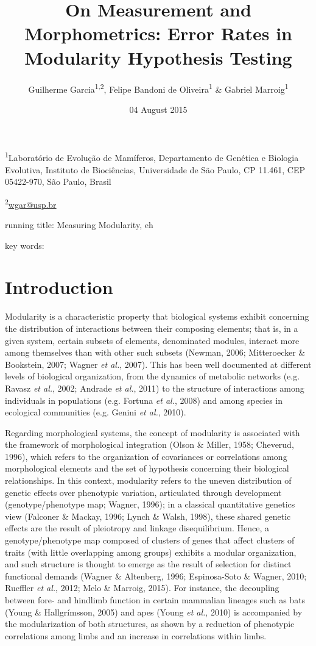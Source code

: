 \documentclass[12pt,]{article}
\title{On Measurement and Morphometrics: Error Rates in Modularity Hypothesis
Testing}
\author{Guilherme Garcia\textsuperscript{1,2}, Felipe Bandoni de
Oliveira\textsuperscript{1} \& Gabriel Marroig\textsuperscript{1}}
\date{04 August 2015}
\begin{document}
\maketitle


\linenumbers
\modulolinenumbers[2]

\onehalfspacing

\textsuperscript{1}Laboratório de Evolução de Mamíferos, Departamento de
Genética e Biologia Evolutiva, Instituto de Biociências, Universidade de
São Paulo, CP 11.461, CEP 05422-970, São Paulo, Brasil

\textsuperscript{2}\href{mailto:wgar@usp.br}{wgar@usp.br}

running title: Measuring Modularity, eh

key words:

\section{Introduction}\label{introduction}

Modularity is a characteristic property that biological systems exhibit
concerning the distribution of interactions between their composing
elements; that is, in a given system, certain subsets of elements,
denominated modules, interact more among themselves than with other such
subsets (Newman, 2006; Mitteroecker \& Bookstein, 2007; Wagner \emph{et
al.}, 2007). This has been well documented at different levels of
biological organization, from the dynamics of metabolic networks (e.g.
Ravasz \emph{et al.}, 2002; Andrade \emph{et al.}, 2011) to the
structure of interactions among individuals in populations (e.g. Fortuna
\emph{et al.}, 2008) and among species in ecological communities (e.g.
Genini \emph{et al.}, 2010).

Regarding morphological systems, the concept of modularity is associated
with the framework of morphological integration (Olson \& Miller, 1958;
Cheverud, 1996), which refers to the organization of covariances or
correlations among morphological elements and the set of hypothesis
concerning their biological relationships. In this context, modularity
refers to the uneven distribution of genetic effects over phenotypic
variation, articulated through development (genotype/phenotype map;
Wagner, 1996); in a classical quantitative genetics view (Falconer \&
Mackay, 1996; Lynch \& Walsh, 1998), these shared genetic effects are
the result of pleiotropy and linkage disequilibrium. Hence, a
genotype/phenotype map composed of clusters of genes that affect
clusters of traits (with little overlapping among groups) exhibits a
modular organization, and such structure is thought to emerge as the
result of selection for distinct functional demands (Wagner \&
Altenberg, 1996; Espinosa-Soto \& Wagner, 2010; Rueffler \emph{et al.},
2012; Melo \& Marroig, 2015). For instance, the decoupling between fore-
and hindlimb function in certain mammalian lineages such as bats (Young
\& Hallgrímsson, 2005) and apes (Young \emph{et al.}, 2010) is
accompanied by the modularization of both structures, as shown by a
reduction of phenotypic correlations among limbs and an increase in
correlations within limbs.
\end{document}
